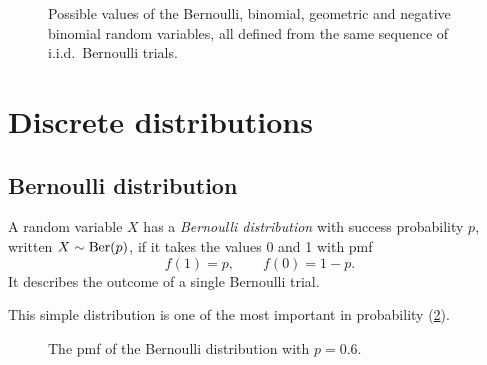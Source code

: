 \begin{figure}[H]
\centering
{}
\caption{Possible values of the Bernoulli, binomial, geometric and negative binomial random variables, all defined from the same sequence of i.i.d.\ Bernoulli trials.}
\label{fig:bernoulli-family-supports}
\end{figure}


\section{Discrete distributions}\label{sec:discrete-families}

\subsection{Bernoulli distribution}\label{sec:bernoulli}

\begin{definition}\label{def:bernoulli}
A random variable $X$ has a \emph{Bernoulli distribution} with success probability $p$, written $X \sim \mathrm{Ber}(p)$, if it takes the values 0 and 1 with pmf
\[
  f(1) = p, \qquad f(0) = 1 - p.
\]
It describes the outcome of a single Bernoulli trial.
\end{definition}

This simple distribution is one of the most important in probability (\cref{fig:bernoulli-pmf}).

\begin{figure}[H]
\centering
{}
\caption{The pmf of the Bernoulli distribution with $p = 0.6$.}
\label{fig:bernoulli-pmf}
\end{figure}


